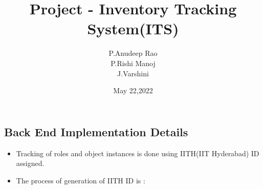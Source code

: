 \documentclass[12pt,a4paper]{article}
\title{\textbf{Project - Inventory Tracking System(ITS)}}
\author{P.Anudeep Rao\\ P.Rishi Manoj\\ J.Varshini}
\date{May 22,2022}
\begin{document}
    \maketitle
    \begin{Large}
     \centering 
     \section*{Back End Implementation Details}
    \end{Large}
    
    \begin{itemize}
       \item Tracking of roles and object instances is done using IITH(IIT Hyderabad) ID assigned. 
       \item The process of generation of IITH ID is :
    \end{itemize}
    
\end{document}
